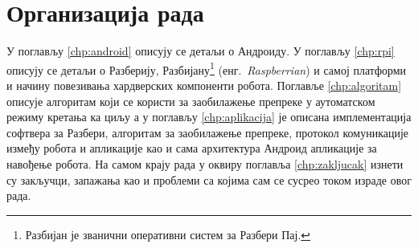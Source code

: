 \documentclass[12pt,oneside]{memoir}
\theoremstyle{remark}
\begin{document}
\section{Организација рада}
У поглављу \ref{chp:android} описују се детаљи о Андроиду. У поглављу \ref{chp:rpi} описују се детаљи о Разберију, Разбијану\footnote{Разбијан је званични оперативни систем за Разбери Пај.} (енг.~{\em Raspberrian}) и самој платформи и начину повезивања хардверских компоненти робота. Поглавље  \ref{chp:algoritam} описује алгоритам који се користи за заобилажење препреке у аутоматском режиму кретања ка циљу а у поглављу \ref{chp:aplikacija} је описана имплементација софтвера за Разбери, алгоритам за заобилажење препреке, протокол комуникације између робота и апликације као и сама архитектура Андроид апликације за навођење робота. На самом крају рада у оквиру поглавља \ref{chp:zakljucak} изнети су закључци, запажања као и проблеми са којима сам се сусрео током израде овог рада.





\end{document}

